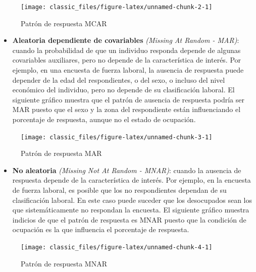 \begin{figure}

{\centering \texttt{[image: classic\_files/figure-latex/unnamed-chunk-2-1]} 

}

\caption{Patrón de respuesta MCAR}\label{fig:unnamed-chunk-2}
\end{figure}

\begin{itemize}
\tightlist
\item
  \textbf{Aleatoria dependiente de covariables} \emph{(Missing At Random - MAR)}: cuando la probabilidad de que un individuo responda depende de algunas covariables auxiliares, pero no depende de la característica de interés. Por ejemplo, en una encuesta de fuerza laboral, la ausencia de respuesta puede depender de la edad del respondientes, o del sexo, o incluso del nivel económico del individuo, pero no depende de su clasificación laboral. El siguiente gráfico muestra que el patrón de ausencia de respuesta podría ser MAR puesto que el sexo y la zona del respondiente están influenciando el porcentaje de respuesta, aunque no el estado de ocupación.
\end{itemize}

\begin{figure}

{\centering \texttt{[image: classic\_files/figure-latex/unnamed-chunk-3-1]} 

}

\caption{Patrón de respuesta MAR}\label{fig:unnamed-chunk-3}
\end{figure}

\begin{itemize}
\tightlist
\item
  \textbf{No aleatoria} \emph{(Missing Not At Random - MNAR)}: cuando la ausencia de respuesta depende de la característica de interés. Por ejemplo, en la encuesta de fuerza laboral, es posible que los no respondientes dependan de su clasificación laboral. En este caso puede suceder que los desocupados sean los que sistemáticamente no respondan la encuesta. El siguiente gráfico muestra indicios de que el patrón de respuesta es MNAR puesto que la condición de ocupación es la que influencia el porcentaje de respuesta.
\end{itemize}

\begin{figure}

{\centering \texttt{[image: classic\_files/figure-latex/unnamed-chunk-4-1]} 

}

\caption{Patrón de respuesta MNAR}\label{fig:unnamed-chunk-4}
\end{figure}

